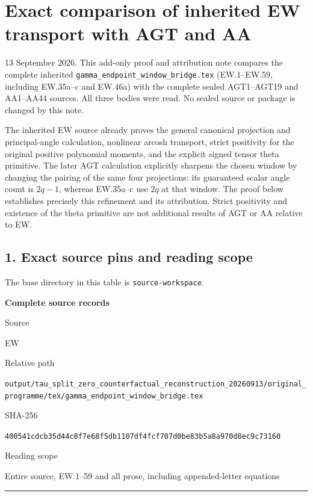 \section{Exact comparison of inherited EW transport with AGT and AA}\label{GraphV2:exact-comparison-of-inherited-ew-transport-with-agt-and-aa}

13 September 2026. This add-only proof and attribution note compares the complete inherited {\small\nolinkurl{gamma_endpoint_window_bridge.tex}} (EW.1--EW.59, including EW.35a--c and EW.46a) with the complete sealed AGT1--AGT19 and AA1--AA44 sources. All three bodies were read. No sealed source or package is changed by this note.

The inherited EW source already proves the general canonical projection and principal-angle calculation, nonlinear arcosh transport, strict positivity for the original positive polynomial moments, and the explicit signed tensor theta primitive. The later AGT calculation explicitly sharpens the chosen window by changing the pairing of the same four projections: its guaranteed scalar angle count is \(2q-1\), whereas EW.35a--c use \(2q\) at that window. The proof below establishes precisely this refinement and its attribution. Strict positivity and existence of the theta primitive are not additional results of AGT or AA relative to EW.

\subsection{1. Exact source pins and reading scope}\label{GraphV2:exact-source-pins-and-reading-scope}

The base directory in this table is \texttt{source-workspace}.

\textbf{Complete source records}

Source

EW

Relative path

{\small\nolinkurl{output/tau_split_zero_counterfactual_reconstruction_20260913/original_programme/tex/gamma_endpoint_window_bridge.tex}}

SHA-256

\nolinkurl{400541cdcb35d44c0f7e68f5db1107df4fcf707d0be83b5a8a970d8ec9c73160}

Reading scope

Entire source, EW.1--59 and all prose, including appended-letter equations

\begin{center}\rule{0.5\linewidth}{0.5pt}\end{center}

